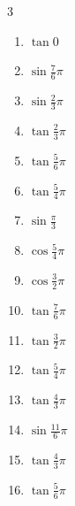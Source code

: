 \begin{multicols}{3}
\begin{enumerate}
  \item $\displaystyle \tan{0}$
        \phantom{$\displaystyle =0$}

  \item $\displaystyle \sin{\frac{7}{6}\pi}$

  \item $\displaystyle \sin{\frac{2}{3}\pi}$

  \item $\displaystyle \tan{\frac{2}{3}\pi}$

  \item $\displaystyle \tan{\frac{5}{6}\pi}$

  \item $\displaystyle \tan{\frac{5}{4}\pi}$
        \phantom{$\displaystyle =1$}

  \item $\displaystyle \sin{\frac{\pi}{3}}$

  \item $\displaystyle \cos{\frac{5}{4}\pi}$

  \item $\displaystyle \cos{\frac{3}{2}\pi}$
        \phantom{$\displaystyle =0$}

  \item $\displaystyle \tan{\frac{7}{6}\pi}$

  \item $\displaystyle \tan{\frac{3}{2}\pi}$
        \phantom{$\displaystyle \quad なし$}

  \item $\displaystyle \tan{\frac{5}{4}\pi}$
        \phantom{$\displaystyle =1$}

  \item $\displaystyle \tan{\frac{4}{3}\pi}$

  \item $\displaystyle \sin{\frac{11}{6}\pi}$

  \item $\displaystyle \tan{\frac{4}{3}\pi}$

  \item $\displaystyle \tan{\frac{5}{6}\pi}$


\end{enumerate}
\end{multicols}
